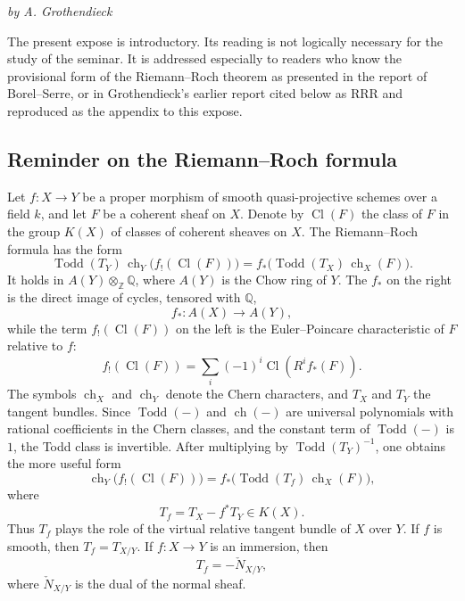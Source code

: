 \documentclass[11pt]{article}
\theoremstyle{plain}
\theoremstyle{definition}
\theoremstyle{remark}
\newcommand{\QQ}{\mathbb Q}
\newcommand{\ZZ}{\mathbb Z}
\providecommand{\ch}{\operatorname{ch}}
\providecommand{\Cl}{\operatorname{Cl}}
\providecommand{\Todd}{\operatorname{Todd}}
\begin{document}
\begin{center}
\emph{by A. Grothendieck}
\end{center}

The present expose is introductory. Its reading is not logically necessary for the study of the seminar. It is addressed especially to readers who know the provisional form of the Riemann--Roch theorem as presented in the report of Borel--Serre, or in Grothendieck's earlier report cited below as RRR and reproduced as the appendix to this expose.

\subsection{Reminder on the Riemann--Roch formula}

Let $f:X\to Y$ be a proper morphism of smooth quasi-projective schemes over a field $k$, and let $F$ be a coherent sheaf on $X$. Denote by $\Cl(F)$ the class of $F$ in the group $K(X)$ of classes of coherent sheaves on $X$. The Riemann--Roch formula has the form
\begin{equation}\label{eq:RR1en}
\Todd(T_Y)\,\ch_Y\bigl(f_!(\Cl(F))\bigr)=
   f_*\bigl(\Todd(T_X)\,\ch_X(F)\bigr).
\end{equation}
It holds in $A(Y)\otimes_{\ZZ}\QQ$, where $A(Y)$ is the Chow ring of $Y$. The $f_*$ on the right is the direct image of cycles, tensored with $\QQ$,
\[
   f_*:A(X)\longrightarrow A(Y),
\]
while the term $f_!(\Cl(F))$ on the left is the Euler--Poincare characteristic of $F$ relative to $f$:
\[
   f_!(\Cl(F))=\sum_i(-1)^i\Cl(R^if_*(F)).
\]
The symbols $\ch_X$ and $\ch_Y$ denote the Chern characters, and $T_X$ and $T_Y$ the tangent bundles. Since $\Todd(-)$ and $\ch(-)$ are universal polynomials with rational coefficients in the Chern classes, and the constant term of $\Todd(-)$ is $1$, the Todd class is invertible. After multiplying by $\Todd(T_Y)^{-1}$, one obtains the more useful form
\begin{equation}\label{eq:RR2en}
\ch_Y\bigl(f_!(\Cl(F))\bigr)=
   f_*\bigl(\Todd(T_f)\,\ch_X(F)\bigr),
\end{equation}
where
\begin{equation}\label{eq:Tfen}
   T_f=T_X-f^*T_Y\in K(X).
\end{equation}
Thus $T_f$ plays the role of the virtual relative tangent bundle of $X$ over $Y$. If $f$ is smooth, then $T_f=T_{X/Y}$. If $f:X\to Y$ is an immersion, then
\[
   T_f=-\check N_{X/Y},
\]
where $\check N_{X/Y}$ is the dual of the normal sheaf.
\end{document}
